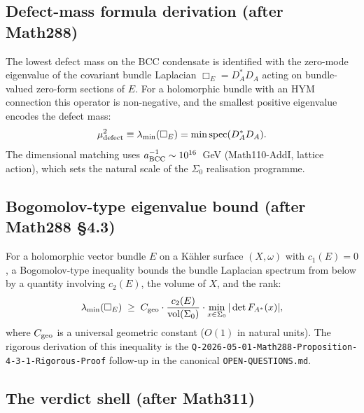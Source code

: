 \subsection{Defect-mass formula derivation (after Math288)}

The lowest defect mass on the BCC condensate is identified with the
zero-mode eigenvalue of the covariant bundle Laplacian
$\Box_E = D_A^* D_A$ acting on bundle-valued zero-form sections of
$E$. For a holomorphic bundle with an HYM connection this operator is
non-negative, and the smallest positive eigenvalue encodes the defect
mass:
\begin{equation}
\mu_{\rm defect}^2 \equiv \lambda_{\min}(\Box_E)
= \min \mathrm{spec}(D_A^* D_A).
\end{equation}
The dimensional matching uses $a_{\rm BCC}^{-1} \sim 10^{16}$~GeV
(Math110-AddI, lattice action), which sets the natural scale of the
$\Sigma_0$ realisation programme.

\subsection{Bogomolov-type eigenvalue bound (after Math288 \S4.3)}

For a holomorphic vector bundle $E$ on a Kähler surface
$(X, \omega)$ with $c_1(E) = 0$, a Bogomolov-type inequality bounds
the bundle Laplacian spectrum from below by a quantity involving
$c_2(E)$, the volume of $X$, and the rank:
\begin{equation}
\lambda_{\min}(\Box_E) \;\geq\; C_{\rm geo}
\cdot \frac{c_2(E)}{\mathrm{vol}(\Sigma_0)}
\cdot \min_{x \in \Sigma_0} |\det F_{A^*}(x)|,
\end{equation}
where $C_{\rm geo}$ is a universal geometric constant ($O(1)$ in
natural units). The rigorous derivation of this inequality is the
\texttt{Q-2026-05-01-Math288-Proposition-4-3-1-Rigorous-Proof}
follow-up in the canonical \texttt{OPEN-QUESTIONS.md}.

\subsection{The verdict shell (after Math311)}


